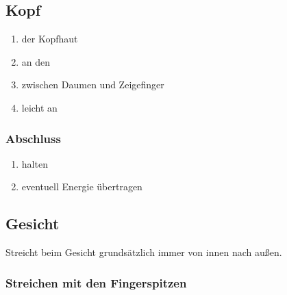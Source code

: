 \subsection{Kopf}

\begin{enumerate}
	\item {} der Kopfhaut
	\item an den 
	\item {} zwischen Daumen und Zeigefinger 
	\item leicht an 
\end{enumerate}

\subsubsection{Abschluss}
\begin{enumerate}
	\item {} halten
	\item eventuell Energie übertragen
\end{enumerate}


\subsection{Gesicht}

Streicht beim Gesicht grundsätzlich immer von innen nach außen.

\subsubsection{Streichen mit den Fingerspitzen}

